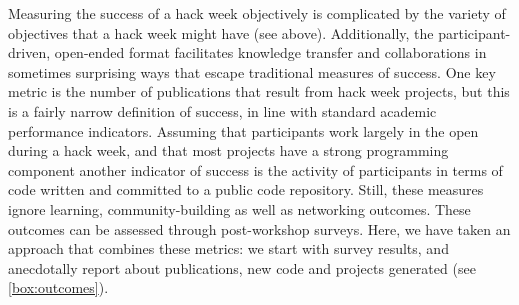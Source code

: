 Measuring the success of a hack week objectively is complicated by the variety of objectives that a hack week might have (see above).
Additionally, the participant-driven, open-ended format facilitates knowledge transfer and collaborations in sometimes surprising ways that escape traditional measures of success.
One key metric is the number of publications that result from hack week projects, but this is a fairly narrow definition of success, in line with standard academic performance indicators.
Assuming that participants work largely in the open during a hack week, and that most projects have a strong programming component another indicator of success is the activity of participants in terms of code written and committed to a public code repository.
Still, these measures ignore learning, community-building as well as networking outcomes.
These outcomes can be assessed through post-workshop surveys.
Here, we have taken an approach that combines these metrics: we start with survey results, and anecdotally report about publications, new code and projects generated (see \ref{box:outcomes}).


